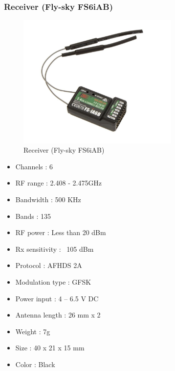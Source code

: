\subsubsection{Receiver (Fly-sky FS6iAB)}
\begin{figure}[h!]
\centering
\includegraphics[width=8cm]{./Figures/receiver_qc.png}
\caption{Receiver (Fly-sky FS6iAB)}
\label{receiver_qc}
\end{figure}

\begin{itemize}
    \item Channels 		: 6
    \item RF range 		: 2.408 - 2.475GHz
    \item Bandwidth 		: 500 KHz
    \item Bands	             		: 135
    \item RF power 		: Less than 20 dBm
    \item Rx sensitivity 		: ~105 dBm
    \item Protocol 		: AFHDS 2A
    \item Modulation type 	: GFSK
    \item Power input 		: 4 – 6.5 V DC
    \item Antenna length 		: 26 mm x 2
    \item Weight			: 7g
    \item Size 			: 40 x 21 x 15 mm
   \item Color 			: Black
\end{itemize}

